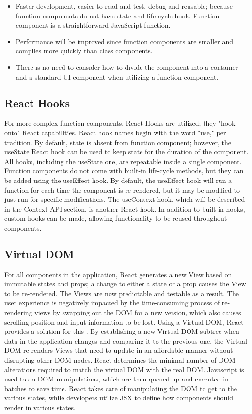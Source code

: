 \begin{itemize}
  \item Faster development, easier to read and test, debug and reusable; because function components do not have state and life-cycle-hook. Function component is a straightforward JavaScript function.
  \item Performance will be improved since function components are smaller and compiles more quickly than class components.
  \item There is no need to consider how to divide the component into a container and a standard UI component when utilizing a function component.
\end{itemize}

\subsection{React Hooks}
For more complex function components, React Hooks are utilized; they "hook onto" React capabilities. React hook names begin with the word "use," per tradition. By default, state is absent from function component; however, the useState React hook can be used to keep state for the duration of the component. All hooks, including the useState one, are repeatable inside a single component.
Function components do not come with built-in life-cycle methods, but they can be added using the useEffect hook. By default, the useEffect hook will run a function for each time the component is re-rendered, but it may be modified to just run for specific modifications.
The useContext hook, which will be described in the Context API section, is another React hook. In addition to built-in hooks, custom hooks can be made, allowing functionality to be reused throughout components.

\subsection{Virtual DOM}
For all components in the application, React generates a new View based on immutable states and props; a change to either a state or a prop causes the View to be re-rendered. The Views are now predictable and testable as a result. The user experience is negatively impacted by the time-consuming process of re-rendering views by swapping out the DOM for a new version, which also causes scrolling position and input information to be lost. Using a Virtual DOM, React provides a solution for this \autocite{david2020building}.
By establishing a new Virtual DOM subtree when data in the application changes and comparing it to the previous one, the Virtual DOM re-renders Views that need to update in an affordable manner without disrupting other DOM nodes. React determines the minimal number of DOM alterations required to match the virtual DOM with the real DOM. Javascript is used to do DOM manipulations, which are then queued up and executed in batches to save time. React takes care of manipulating the DOM to get to the various states, while developers utilize JSX to define how components should render in various states.

